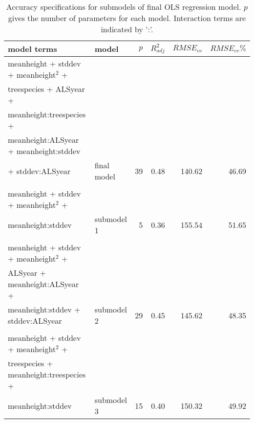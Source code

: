 \begin{table*}[!htbp]
	\centering
	\caption{Accuracy specifications for submodels of final OLS regression model. $p$ gives the number of parameters for each model. Interaction terms are indicated by ':'.} 
	\label{tab:regmod:mt}
	\begin{tabular}{llrrrr}
  \hline
model terms & model & $p$ & $R^2_{adj}$ & $RMSE_{cv}$ & $RMSE_{cv}\%$ \\ 
  \hline
  meanheight + stddev + meanheight$^2$ + \\ treespecies + ALSyear + \\ meanheight:treespecies + \\ meanheight:ALSyear + meanheight:stddev \\ + stddev:ALSyear & final model &  39 & 0.48 & 140.62 & 46.69 \\ \\
  meanheight + stddev + meanheight$^2$ + \\ meanheight:stddev & submodel 1 &   5 & 0.36 & 155.54 & 51.65 \\ \\
  meanheight + stddev + meanheight$^2$ + \\ ALSyear + meanheight:ALSyear + \\ meanheight:stddev + stddev:ALSyear & submodel 2 &  29 & 0.45 & 145.62 & 48.35 \\ \\
  meanheight + stddev + meanheight$^2$ + \\ treespecies + meanheight:treespecies + \\ meanheight:stddev & submodel 3 &  15 & 0.40 & 150.32 & 49.92 \\ 
   \hline
\hline
\end{tabular}
\end{table*}


